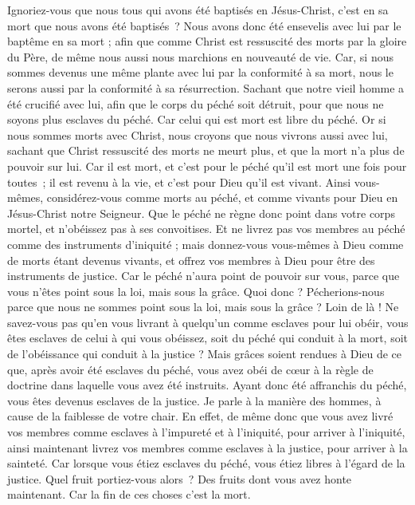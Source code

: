 \begin{multicols}{2}
Ignoriez-vous que nous tous qui avons été baptisés en Jésus-Christ, c’est en sa mort que nous avons été baptisés ?
Nous avons donc été ensevelis avec lui par le baptême en sa mort ; afin que comme Christ est ressuscité des morts par la gloire du Père, de même nous aussi nous marchions en nouveauté de vie.
Car, si nous sommes devenus une même plante avec lui par la conformité à sa mort, nous le serons aussi par la conformité à sa résurrection.
Sachant que notre vieil homme a été crucifié avec lui, afin que le corps du péché soit détruit, pour que nous ne soyons plus esclaves du péché.
Car celui qui est mort est libre du péché.
Or si nous sommes morts avec Christ, nous croyons que nous vivrons aussi avec lui,
sachant que Christ ressuscité des morts ne meurt plus, et que la mort n'a plus de pouvoir sur lui.
Car il est mort, et c’est pour le péché qu’il est mort une fois pour toutes ; il est revenu à la vie, et c’est pour Dieu qu’il est vivant.
Ainsi vous-mêmes, considérez-vous comme morts au péché, et comme vivants pour Dieu en Jésus-Christ notre Seigneur.
Que le péché ne règne donc point dans votre corps mortel, et n’obéissez pas à ses convoitises.
Et ne livrez pas vos membres au péché comme des instruments d'iniquité ; mais donnez-vous vous-mêmes à Dieu comme de morts étant devenus vivants, et offrez vos membres à Dieu pour être des instruments de justice.
Car le péché n'aura point de pouvoir sur vous, parce que vous n'êtes point sous la loi, mais sous la grâce.
Quoi donc ? Pécherions-nous parce que nous ne sommes point sous la loi, mais sous la grâce ? Loin de là !
Ne savez-vous pas qu’en vous livrant à quelqu’un comme esclaves pour lui obéir, vous êtes esclaves de celui à qui vous obéissez, soit du péché qui conduit à la mort, soit de l'obéissance qui conduit à la justice ?
Mais grâces soient rendues à Dieu de ce que, après avoir été esclaves du péché, vous avez obéi de cœur à la règle de doctrine dans laquelle vous avez été instruits.
Ayant donc été affranchis du péché, vous êtes devenus esclaves de la justice.
Je parle à la manière des hommes, à cause de la faiblesse de votre chair. En effet, de même donc que vous avez livré vos membres comme esclaves à l’impureté et à l’iniquité, pour arriver à l’iniquité, ainsi maintenant livrez vos membres comme esclaves à la justice, pour arriver à la sainteté.
Car lorsque vous étiez esclaves du péché, vous étiez libres à l'égard de la justice.
Quel fruit portiez-vous alors ? Des fruits dont vous avez honte maintenant. Car la fin de ces choses c’est la mort.

\end{multicols}

